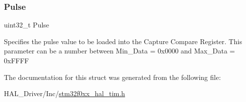 \subsubsection{\texorpdfstring{Pulse}{Pulse}}
{\footnotesize\ttfamily uint32\+\_\+t Pulse}

Specifies the pulse value to be loaded into the Capture Compare Register. This parameter can be a number between Min\+\_\+\+Data = 0x0000 and Max\+\_\+\+Data = 0x\+F\+F\+FF 

The documentation for this struct was generated from the following file\+:\begin{DoxyCompactItemize}
\item 
H\+A\+L\+\_\+\+Driver/\+Inc/\hyperlink{stm32f0xx__hal__tim_8h}{stm32f0xx\+\_\+hal\+\_\+tim.\+h}\end{DoxyCompactItemize}
